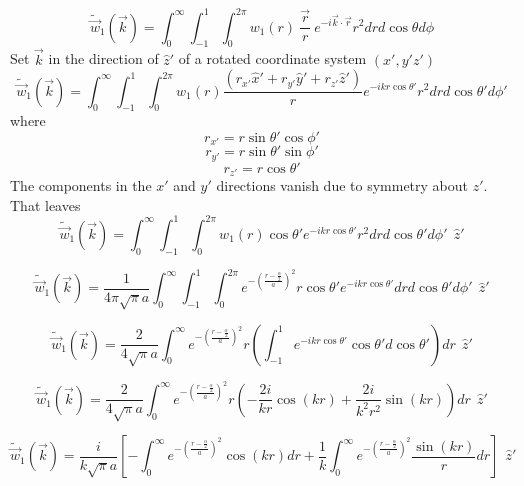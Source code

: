 \documentclass[double,12pt]{beavtex}
\begin{document}
\begin{equation}{\widetilde{\vec{w}}_1(\vec{k})=\int_{0}^{\infty}\int_{-1}^{1}\int_{0}^{2\pi}w_1(r){~}\frac{\vec{r}}{r}{~}e^{-i\vec{k}\cdot{\vec{r}}}r^2d{r}d{\cos\theta}d{\phi}}\end{equation}
Set $\vec{k}$ in the direction of $\hat{z}'$ of a rotated coordinate system $(x',y'z')$ 
\begin{equation}{\widetilde{\vec{w}}_1(\vec{k})=\int_{0}^{\infty}\int_{-1}^{1}\int_{0}^{2\pi}w_1(r)\frac{(r_{x'}\hat{x}'+r_{y'}\hat{y}'+r_{z'}\hat{z}')}{r}e^{-ikr\cos\theta'}r^2d{r}d{\cos\theta'}d{\phi'}}\end{equation}
where
\begin{displaymath}{r_{x'}=r\sin\theta'\cos\phi'}\end{displaymath}
\begin{displaymath}{r_{y'}=r\sin\theta'\sin\phi'}\end{displaymath}
\begin{displaymath}{r_{z'}=r\cos\theta'}\end{displaymath} 
The components in the $x'$ and $y'$ directions vanish due to symmetry about $z'$. That leaves
\begin{equation}{\widetilde{\vec{w}}_1(\vec{k})=\int_{0}^{\infty}\int_{-1}^{1}\int_{0}^{2\pi}w_1(r)\cos{\theta}'e^{-ikr\cos\theta'}r^2d{r}d{\cos\theta'}d{\phi'}{~~}\hat{z}'}\end{equation}

\begin{equation}{\widetilde{\vec{w}}_1(\vec{k})=\frac{1}{4\pi\sqrt{\pi}a}\int_{0}^{\infty}\int_{-1}^{1}\int_{0}^{2\pi}e^{-\left(\frac{r-\frac{\alpha}{2}}{a}\right)^2}r\cos{\theta}'e^{-ikr\cos\theta'}d{r}d{\cos\theta'}d{\phi'}{~~}\hat{z}'}\end{equation}

\begin{equation}{\widetilde{\vec{w}}_1(\vec{k})=\frac{2}{4\sqrt{\pi}a}\int_{0}^{\infty}e^{-\left(\frac{r-\frac{\alpha}{2}}{a}\right)^2}r\left(\int_{-1}^{1}e^{-ikr\cos\theta'}\cos{\theta}'d{\cos\theta'}\right)d{r}{~~}\hat{z}'}\end{equation}

\begin{equation}{\widetilde{\vec{w}}_1(\vec{k})=\frac{2}{4\sqrt{\pi}a}\int_{0}^{\infty}e^{-\left(\frac{r-\frac{\alpha}{2}}{a}\right)^2}r\left(-\frac{2i}{kr}\cos(kr)+\frac{2i}{k^2r^2}\sin(kr)\right)d{r}{~~}\hat{z}'}\end{equation}

\begin{equation}{\widetilde{\vec{w}}_1(\vec{k})=\frac{i}{k\sqrt{\pi}a}\left[-\int_{0}^{\infty}e^{-\left(\frac{r-\frac{\alpha}{2}}{a}\right)^2}\cos(kr)d{r}+\frac{1}{k}\int_{0}^{\infty}e^{-\left(\frac{r-\frac{\alpha}{2}}{a}\right)^2}\frac{\sin(kr)}{r}d{r}\right]{~~}\hat{z}'}\end{equation}
\end{document}
